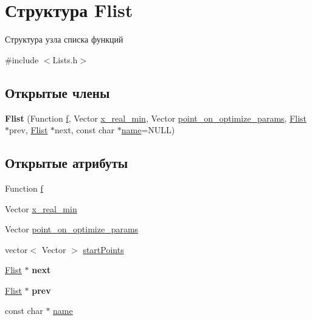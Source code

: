 \hypertarget{structFlist}{}\section{Структура Flist}
\label{structFlist}


Структура узла списка функций  




{\ttfamily \#include $<$Lists.\+h$>$}

\subsection*{Открытые члены}
\begin{DoxyCompactItemize}
\item 
\mbox{\label{structFlist_a9285731c498249bb6a645bae563ecc1b}} 
{\bfseries Flist} (Function \mbox{\hyperlink{structFlist_a296174c97f684b938d00d3eeeac18c36}{f}}, Vector \mbox{\hyperlink{structFlist_a597f07bd67e9afba1666dcc0c61dc33f}{x\+\_\+real\+\_\+min}}, Vector \mbox{\hyperlink{structFlist_a781e14b6b3d9b4f0c0c0e23fad2ab45e}{point\+\_\+on\+\_\+optimize\+\_\+params}}, \mbox{\hyperlink{structFlist}{Flist}} $\ast$prev, \mbox{\hyperlink{structFlist}{Flist}} $\ast$next, const char $\ast$\mbox{\hyperlink{structFlist_a54568e8e2278ecf5c53668a00b9aedc3}{name}}=N\+U\+LL)
\end{DoxyCompactItemize}
\subsection*{Открытые атрибуты}
\begin{DoxyCompactItemize}
\item 
Function \mbox{\hyperlink{structFlist_a296174c97f684b938d00d3eeeac18c36}{f}}
\item 
Vector \mbox{\hyperlink{structFlist_a597f07bd67e9afba1666dcc0c61dc33f}{x\+\_\+real\+\_\+min}}
\item 
Vector \mbox{\hyperlink{structFlist_a781e14b6b3d9b4f0c0c0e23fad2ab45e}{point\+\_\+on\+\_\+optimize\+\_\+params}}
\item 
vector$<$ Vector $>$ \mbox{\hyperlink{structFlist_a2613ea577e8ae831bc9778276d7cf866}{start\+Points}}
\item 
\mbox{\label{structFlist_a55e92011cce56ae7b3ff9c90bc7392da}} 
\mbox{\hyperlink{structFlist}{Flist}} $\ast$ {\bfseries next}
\item 
\mbox{\label{structFlist_a6384d7d17a56d3c17b23c1f42d8fbce1}} 
\mbox{\hyperlink{structFlist}{Flist}} $\ast$ {\bfseries prev}
\item 
const char $\ast$ \mbox{\hyperlink{structFlist_a54568e8e2278ecf5c53668a00b9aedc3}{name}}
\end{DoxyCompactItemize}


